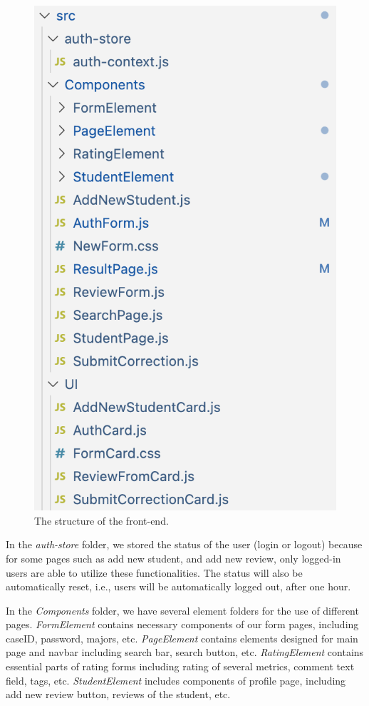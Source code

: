 \documentclass[12pt]{article}
\begin{document}
\begin{figure}[h]
    \centering
    \label{fig:str}
    \includegraphics[scale=0.5]{front-str.png}
    \caption{The structure of the front-end.}
\end{figure}
In the \textit{auth-store} folder, 
we stored the status of the user (login or logout) because for some pages such as add new student, and add new review, 
only logged-in users are able to utilize these functionalities. The status will also be automatically reset, i.e., users 
will be automatically logged out, after one hour.

In the \textit{Components} folder, we have several element folders for the use of different pages. \textit{FormElement} contains 
necessary components of our form pages, including caseID, password, majors, etc. \textit{PageElement} contains elements designed 
for main page and navbar including search bar, search button, etc.  \textit{RatingElement} contains essential parts of rating forms 
including rating of several metrics, comment text field, tags, etc. \textit{StudentElement} includes components of 
profile page, including add new review button, reviews of the student, etc.
\end{document}
